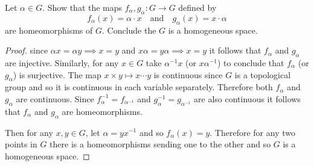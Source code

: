 \begin{ex}{4}
    Let $\alpha\in G$. Show that the maps $f_\alpha, g_\alpha:G\to G$ defined by
    $$f_\alpha(x)=\alpha\cdot x\quad\text{and}\quad g_\alpha(x)=x\cdot \alpha$$
    are homeomorphisms of $G$. Conclude the $G$ is a homogeneous space. 
\end{ex}
\begin{proof}
    since $\alpha x=\alpha y\implies x=y$ and $x\alpha=y\alpha\implies x=y$ it follows that $f_\alpha$ and $g_\alpha$ are injective.
    Similarly, for any $x\in G$ take $\alpha^{-1}x$ (or $x\alpha^{-1}$) to conclude that $f_\alpha$ (or $g_\alpha$) is surjective.
    The map $x\times y\mapsto x\cdots y$ is continuous since $G$ is a topological group and so it is continuous in each variable separately.
    Therefore both $f_\alpha$ and $g_\alpha$ are continuous. Since $f_\alpha^{-1}=f_{\alpha^{-1}}$ and $g_\alpha^{-1}=g_{\alpha^{-1}}$ are also continuous it follows that $f_\alpha$ and $g_\alpha$ are homeomorphisms.

    Then for any $x,y\in G$, let $\alpha = yx^{-1}$ and so $f_\alpha(x)=y$. Therefore for any two points in $G$ there is a homeomorphisms sending one to the other and so $G$ is a homogeneous space.
\end{proof}
